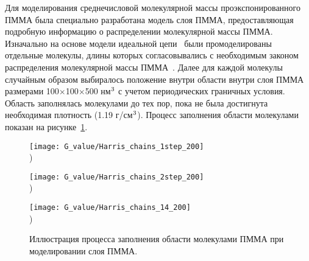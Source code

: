 Для моделирования среднечисловой молекулярной массы проэкспонированного ПММА была специально разработана модель слоя ПММА, предоставляющая подробную информацию о распределении молекулярной массы \linebreak ПММА. Изначально на основе модели идеальной цепи~\cite{Han_2003} были промоделированы отдельные молекулы, длины которых согласовывались с необходимым законом распределения молекулярной массы ПММА~\cite{Harris_G_value}. Далее для каждой молекулы случайным образом выбиралось положение внутри области внутри слоя \linebreak ПММА размерами 100$\times$100$\times$500 нм$^\text{3}$ с учетом периодических граничных условия. Область заполнялась молекулами до тех пор, пока не была достигнута необходимая плотность (1.19 г/см$^\text{3}$). Процесс заполнения области молекулами показан на рисунке~\ref{fig:Harris_chains}.

\begin{figure}[t!]
	\begin{minipage}{0.48\textwidth}
		\texttt{[image: G\_value/Harris\_chains\_1step\_200]}
		\vspace{-14.2em} \\ ) \\ \vspace{14.2em}
	\end{minipage}
	\begin{minipage}{0.48\textwidth}
		\texttt{[image: G\_value/Harris\_chains\_2step\_200]}
		\vspace{-14.2em} \\ ) \\ \vspace{14.2em}
	\end{minipage}
	\vspace{-3.5em}
	\begin{center}
		\texttt{[image: G\_value/Harris\_chains\_14\_200]}
		\vspace{-13em} \\ ) \\ \vspace{13em}
	\end{center}
	\vspace{-1.5em}
	\caption{Иллюстрация процесса заполнения области молекулами ПММА при моделировании слоя ПММА.}
	\label{fig:Harris_chains}
\end{figure}

